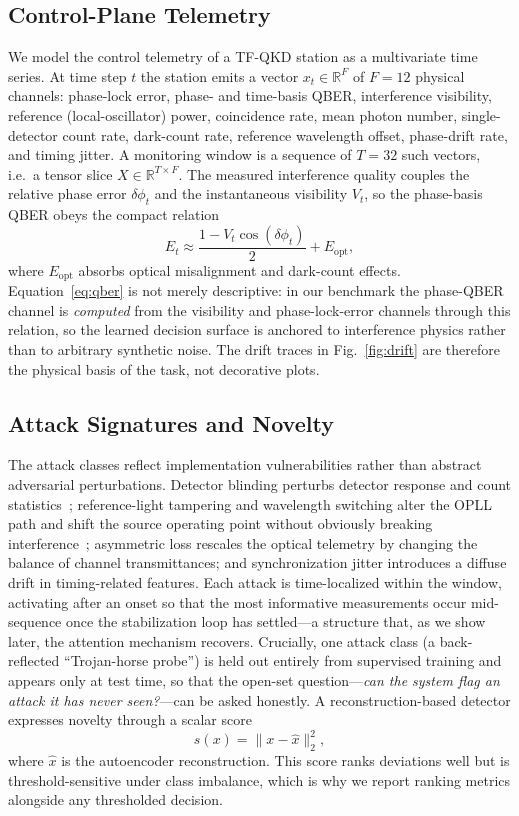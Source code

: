 \documentclass[runningheads]{llncs}
\begin{document}
\subsection{Control-Plane Telemetry}
We model the control telemetry of a TF-QKD station as a multivariate time series. At time step $t$ the station emits a vector $x_t\in\mathbb{R}^{F}$ of $F=12$ physical channels: phase-lock error, phase- and time-basis QBER, interference visibility, reference (local-oscillator) power, coincidence rate, mean photon number, single-detector count rate, dark-count rate, reference wavelength offset, phase-drift rate, and timing jitter. A monitoring window is a sequence of $T=32$ such vectors, i.e.\ a tensor slice $X\in\mathbb{R}^{T\times F}$. The measured interference quality couples the relative phase error $\delta\phi_t$ and the instantaneous visibility $V_t$, so the phase-basis QBER obeys the compact relation
\begin{equation}\label{eq:qber}
E_t \approx \frac{1 - V_t\cos(\delta\phi_t)}{2} + E_{\mathrm{opt}},
\end{equation}
where $E_{\mathrm{opt}}$ absorbs optical misalignment and dark-count effects. Equation~\eqref{eq:qber} is not merely descriptive: in our benchmark the phase-QBER channel is \emph{computed} from the visibility and phase-lock-error channels through this relation, so the learned decision surface is anchored to interference physics rather than to arbitrary synthetic noise. The drift traces in Fig.~\ref{fig:drift} are therefore the physical basis of the task, not decorative plots.

\subsection{Attack Signatures and Novelty}
The attack classes reflect implementation vulnerabilities rather than abstract adversarial perturbations. Detector blinding perturbs detector response and count statistics~\cite{lydersen,makarov}; reference-light tampering and wavelength switching alter the OPLL path and shift the source operating point without obviously breaking interference~\cite{gisin,li2011,peng}; asymmetric loss rescales the optical telemetry by changing the balance of channel transmittances; and synchronization jitter introduces a diffuse drift in timing-related features. Each attack is time-localized within the window, activating after an onset so that the most informative measurements occur mid-sequence once the stabilization loop has settled---a structure that, as we show later, the attention mechanism recovers. Crucially, one attack class (a back-reflected ``Trojan-horse probe'') is held out entirely from supervised training and appears only at test time, so that the open-set question---\emph{can the system flag an attack it has never seen?}---can be asked honestly. A reconstruction-based detector expresses novelty through a scalar score
\begin{equation}\label{eq:ae}
s(x) = \lVert x-\hat{x}\rVert_2^2,
\end{equation}
where $\hat{x}$ is the autoencoder reconstruction. This score ranks deviations well but is threshold-sensitive under class imbalance, which is why we report ranking metrics alongside any thresholded decision.
\end{document}
